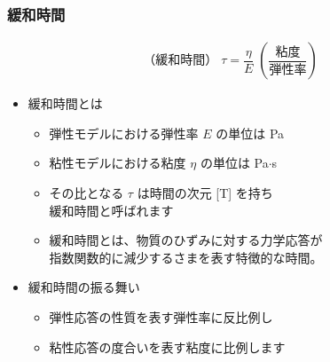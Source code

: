 \documentclass[unicode,12pt]{beamer}%
\begin{document}
\begin{frame}
	\frametitle{緩和時間}
		\begin{align*}
			\text{（緩和時間）}\;\tau = \dfrac{\eta}{E}\; \left( \dfrac{\text{粘度}}{\text{弾性率}} \right)
		\end{align*}
		\vspace{-3mm}
		\begin{itemize}
			\item 緩和時間とは
			\begin{itemize}
				\item 弾性モデルにおける弾性率 $E$ の単位は Pa
				\item 粘性モデルにおける粘度 $\eta$ の単位は Pa$\cdot$s
				\item \alert{その比となる $\tau$ は時間の次元 [T] を持ち\\緩和時間}と呼ばれます
				\item 緩和時間とは、物質のひずみに対する力学応答が\\指数関数的に減少するさまを表す特徴的な時間。
			\end{itemize}
			\item 緩和時間の振る舞い
			\begin{itemize}
				\item 弾性応答の性質を表す\alert{弾性率に反比例}し
				\item 粘性応答の度合いを表す\alert{粘度に比例}します
			\end{itemize}
		\end{itemize}
\end{frame}
\end{document}
